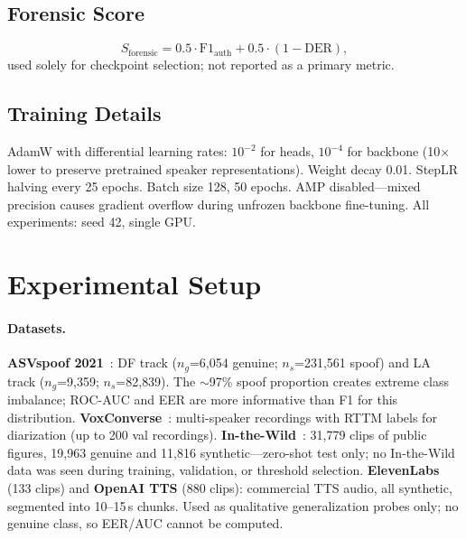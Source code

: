 \documentclass{article}
\begin{document}
\subsection{Forensic Score}
\begin{equation}
  S_{\text{forensic}} = 0.5 \cdot \mathrm{F1}_{\text{auth}} +
                        0.5 \cdot (1 - \mathrm{DER}),
  \label{eq:forensic}
\end{equation}
used solely for checkpoint selection; not reported as a primary metric.

\subsection{Training Details}
AdamW with differential learning rates: $10^{-2}$ for heads, $10^{-4}$ for
backbone (10$\times$ lower to preserve pretrained speaker representations).
Weight decay 0.01. StepLR halving every 25 epochs. Batch size 128, 50 epochs.
AMP disabled---mixed precision causes gradient overflow during unfrozen backbone
fine-tuning. All experiments: seed 42, single GPU.

\section{Experimental Setup}

\paragraph{Datasets.}
\textbf{ASVspoof 2021}~\citep{liu2021asvspoof}: DF track
($n_g$=6{,}054 genuine; $n_s$=231{,}561 spoof) and LA track
($n_g$=9{,}359; $n_s$=82{,}839). The $\sim$97\% spoof proportion creates extreme
class imbalance; ROC-AUC and EER are more informative than F1 for this
distribution. \textbf{VoxConverse}~\citep{chung2020voxconverse}: multi-speaker
recordings with RTTM labels for diarization (up to 200 val recordings).
\textbf{In-the-Wild}~\citep{wang2022itw}: 31{,}779 clips of public figures,
19{,}963 genuine and 11{,}816 synthetic---zero-shot test only; no In-the-Wild
data was seen during training, validation, or threshold selection.
\textbf{ElevenLabs} (133 clips) and \textbf{OpenAI TTS} (880 clips): commercial
TTS audio, all synthetic, segmented into 10--15\,s chunks. Used as qualitative
generalization probes only; no genuine class, so EER/AUC cannot be computed.
\end{document}
